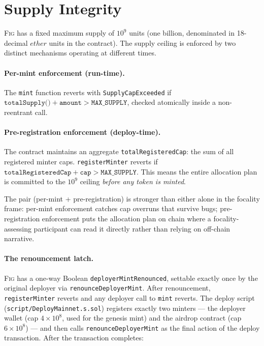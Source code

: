 \documentclass[11pt,a4paper]{article}
\theoremstyle{definition}
\theoremstyle{remark}
\newcommand{\fig}{\textsc{Fig}}
\begin{document}
\section{Supply Integrity}
\label{sec:supply}

\fig{} has a fixed maximum supply of $10^9$ units (one billion,
denominated in 18-decimal $\mathit{ether}$ units in the
contract). The supply ceiling is enforced by two distinct
mechanisms operating at different times.

\paragraph{Per-mint enforcement (run-time).}
The \texttt{mint} function reverts with \texttt{SupplyCapExceeded}
if $\texttt{totalSupply()} + \texttt{amount} > \texttt{MAX\_SUPPLY}$,
checked atomically inside a non-reentrant call.

\paragraph{Pre-registration enforcement (deploy-time).}
The contract maintains an aggregate \texttt{totalRegisteredCap}:
the sum of all registered minter caps. \texttt{registerMinter}
reverts if
$\texttt{totalRegisteredCap} + \texttt{cap} > \texttt{MAX\_SUPPLY}$.
This means the entire allocation plan is committed to the
$10^9$ ceiling \emph{before any token is minted}.

The pair (per-mint + pre-registration) is stronger than either
alone in the focality frame: per-mint enforcement catches cap
overruns that survive bugs; pre-registration enforcement puts the
allocation plan on chain where a focality-assessing participant
can read it directly rather than relying on off-chain narrative.

\paragraph{The renouncement latch.}
\fig{} has a one-way Boolean \texttt{deployerMintRenounced},
settable exactly once by the original deployer via
\texttt{renounceDeployerMint}. After renouncement,
\texttt{registerMinter} reverts and any deployer call to
\texttt{mint} reverts. The deploy script
(\texttt{script/DeployMainnet.s.sol}) registers exactly two
minters --- the deployer wallet (cap $4 \times 10^8$, used for
the genesis mint) and the airdrop contract (cap $6 \times
10^8$) --- and then calls \texttt{renounceDeployerMint} as the
final action of the deploy transaction. After the transaction
completes:
\end{document}
